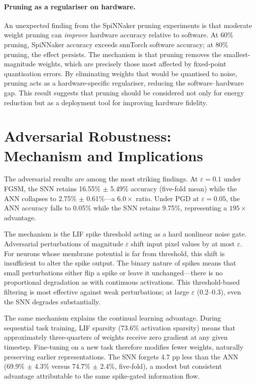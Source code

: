 \paragraph{Pruning as a regulariser on hardware.}
An unexpected finding from the SpiNNaker pruning experiments is that moderate weight pruning can \emph{improve} hardware accuracy relative to software. At 60\% pruning, SpiNNaker accuracy exceeds snnTorch software accuracy; at 80\% pruning, the effect persists. The mechanism is that pruning removes the smallest-magnitude weights, which are precisely those most affected by fixed-point quantisation errors. By eliminating weights that would be quantised to noise, pruning acts as a hardware-specific regulariser, reducing the software--hardware gap. This result suggests that pruning should be considered not only for energy reduction but as a deployment tool for improving hardware fidelity.

\section{Adversarial Robustness: Mechanism and Implications}
\label{sec:adversarial-mechanism}

The adversarial results are among the most striking findings. At $\varepsilon = 0.1$ under FGSM, the SNN retains 16.55\% $\pm$ 5.49\% accuracy (five-fold mean) while the ANN collapses to 2.75\% $\pm$ 0.61\%---a $6.0\times$ ratio. Under PGD at $\varepsilon = 0.05$, the ANN accuracy falls to 0.05\% while the SNN retains 9.75\%, representing a $195\times$ advantage.

The mechanism is the LIF spike threshold acting as a hard nonlinear noise gate. Adversarial perturbations of magnitude $\varepsilon$ shift input pixel values by at most $\varepsilon$. For neurons whose membrane potential is far from threshold, this shift is insufficient to alter the spike output. The binary nature of spikes means that small perturbations either flip a spike or leave it unchanged---there is no proportional degradation as with continuous activations. This threshold-based filtering is most effective against weak perturbations; at large $\varepsilon$ (0.2--0.3), even the SNN degrades substantially.

The same mechanism explains the continual learning advantage. During sequential task training, LIF sparsity (73.6\% activation sparsity) means that approximately three-quarters of weights receive zero gradient at any given timestep. Fine-tuning on a new task therefore modifies fewer weights, naturally preserving earlier representations. The SNN forgets 4.7 pp less than the ANN (69.9\% $\pm$ 4.3\% versus 74.7\% $\pm$ 2.4\%, five-fold), a modest but consistent advantage attributable to the same spike-gated information flow.

